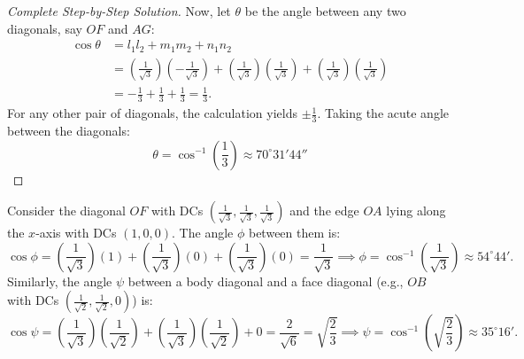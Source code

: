 \begin{proof}[Complete Step-by-Step Solution]
Now, let $\theta$ be the angle between any two diagonals, say $OF$ and $AG$:
\begin{align}
    \cos\theta &= l_1 l_2 + m_1 m_2 + n_1 n_2 \nonumber\\
    &= \left(\frac{1}{\sqrt{3}}\right)\left(-\frac{1}{\sqrt{3}}\right) + \left(\frac{1}{\sqrt{3}}\right)\left(\frac{1}{\sqrt{3}}\right) + \left(\frac{1}{\sqrt{3}}\right)\left(\frac{1}{\sqrt{3}}\right) \nonumber\\
    &= -\frac{1}{3} + \frac{1}{3} + \frac{1}{3} = \frac{1}{3}.
\end{align}
For any other pair of diagonals, the calculation yields $\pm \frac{1}{3}$. Taking the acute angle between the diagonals:
\begin{equation}
    \boxed{\theta = \cos^{-1}\left(\frac{1}{3}\right) \approx 70^\circ 31' 44''}
\end{equation}
\end{proof}

\begin{notebox}
Consider the diagonal $OF$ with DCs $\left(\frac{1}{\sqrt{3}}, \frac{1}{\sqrt{3}}, \frac{1}{\sqrt{3}}\right)$ and the edge $OA$ lying along the $x$-axis with DCs $(1, 0, 0)$.
The angle $\phi$ between them is:
\begin{equation}
    \cos\phi = \left(\frac{1}{\sqrt{3}}\right)(1) + \left(\frac{1}{\sqrt{3}}\right)(0) + \left(\frac{1}{\sqrt{3}}\right)(0) = \frac{1}{\sqrt{3}} \implies \phi = \cos^{-1}\left(\frac{1}{\sqrt{3}}\right) \approx 54^\circ 44'.
\end{equation}
Similarly, the angle $\psi$ between a body diagonal and a face diagonal (e.g., $OB$ with DCs $\left(\frac{1}{\sqrt{2}}, \frac{1}{\sqrt{2}}, 0\right)$) is:
\begin{equation}
    \cos\psi = \left(\frac{1}{\sqrt{3}}\right)\left(\frac{1}{\sqrt{2}}\right) + \left(\frac{1}{\sqrt{3}}\right)\left(\frac{1}{\sqrt{2}}\right) + 0 = \frac{2}{\sqrt{6}} = \sqrt{\frac{2}{3}} \implies \psi = \cos^{-1}\left(\sqrt{\frac{2}{3}}\right) \approx 35^\circ 16'.
\end{equation}
\end{notebox}

